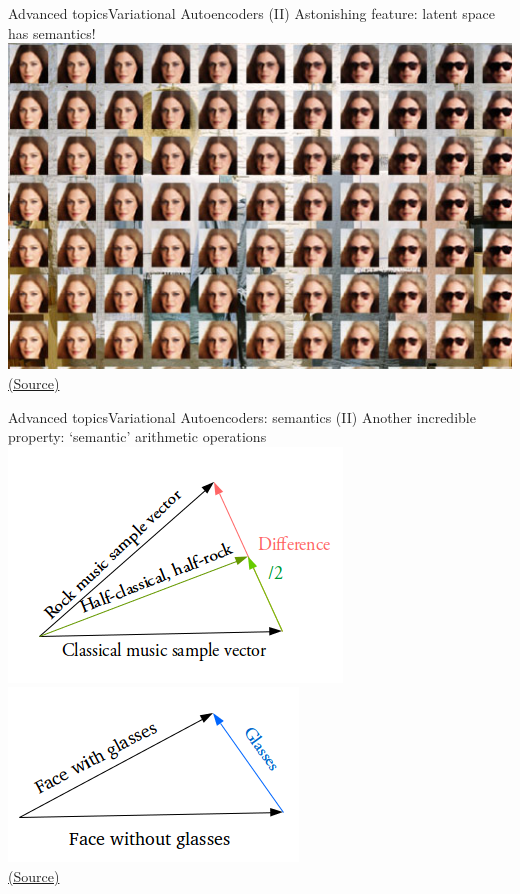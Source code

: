 \documentclass[10pt,compress]{beamer} %
\begin{document}




\begin{frame}{Advanced topics}{Variational Autoencoders (II)}
	Astonishing feature: latent space has semantics!
	\centering\includegraphics[width=0.7\linewidth]{figs/faces.jpg}\\
	\scriptsize\href{https://www.compthree.com/blog/autoencoder/}{(Source)}
\end{frame}

\begin{frame}{Advanced topics}{Variational Autoencoders: semantics (II)}
	Another incredible property: `semantic' arithmetic operations\\
	\centering\includegraphics[width=0.3\linewidth]{figs/vector-vae1.png}\quad
	\centering\includegraphics[width=0.3\linewidth]{figs/vector-vae2.png}\\
	\scriptsize\href{https://towardsdatascience.com/intuitively-understanding-variational-autoencoders-1bfe67eb5daf}{(Source)}
\end{frame}
\end{document}
